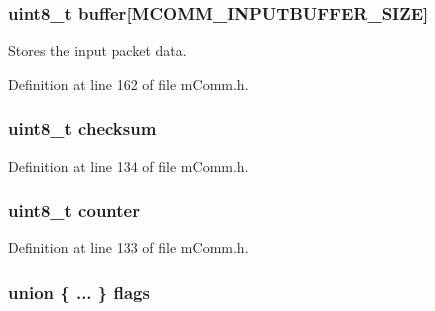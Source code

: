 \subsubsection[{buffer}]{\setlength{\rightskip}{0pt plus 5cm}uint8\+\_\+t buffer\mbox{[}M\+C\+O\+M\+M\+\_\+\+I\+N\+P\+U\+T\+B\+U\+F\+F\+E\+R\+\_\+\+S\+I\+Z\+E\mbox{]}}\label{structm_comm___input_buffer_a8d06f288063a5615acb5cb64ecb2028d}


Stores the input packet data. 



Definition at line 162 of file m\+Comm.\+h.

\hypertarget{structm_comm___input_buffer_a59eac9627282a484fbaf0aa7aa3b8a9a}{}
\subsubsection[{checksum}]{\setlength{\rightskip}{0pt plus 5cm}uint8\+\_\+t checksum}\label{structm_comm___input_buffer_a59eac9627282a484fbaf0aa7aa3b8a9a}


Definition at line 134 of file m\+Comm.\+h.

\hypertarget{structm_comm___input_buffer_a0480b812cba9c1d9c71a5fb1071bd0fc}{}
\subsubsection[{counter}]{\setlength{\rightskip}{0pt plus 5cm}uint8\+\_\+t counter}\label{structm_comm___input_buffer_a0480b812cba9c1d9c71a5fb1071bd0fc}


Definition at line 133 of file m\+Comm.\+h.

\hypertarget{structm_comm___input_buffer_ae65be2fdbb0559c8de9fb8842bd6338e}{}
\subsubsection[{flags}]{\setlength{\rightskip}{0pt plus 5cm}union \{ ... \}   flags}\label{structm_comm___input_buffer_ae65be2fdbb0559c8de9fb8842bd6338e}
\hypertarget{structm_comm___input_buffer_a69e2d5ccbb19f5e4b8bc58074fca8f54}{}
